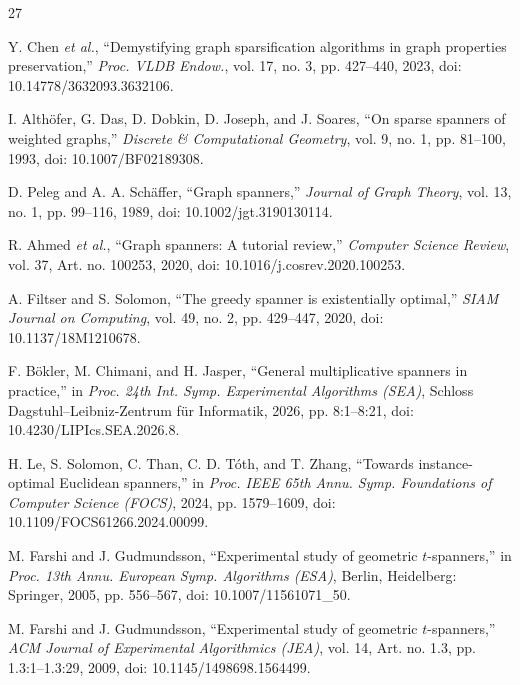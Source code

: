 \documentclass[conference]{IEEEtran}
\begin{document}
\begin{thebibliography}{27}

Y. Chen \textit{et al.},
``Demystifying graph sparsification algorithms in graph properties preservation,''
\textit{Proc. VLDB Endow.},
vol. 17, no. 3, pp. 427--440, 2023,
doi: 10.14778/3632093.3632106.

I. Alth\"{o}fer, G. Das, D. Dobkin, D. Joseph, and J. Soares,
``On sparse spanners of weighted graphs,''
\textit{Discrete \& Computational Geometry},
vol. 9, no. 1, pp. 81--100, 1993,
doi: 10.1007/BF02189308.

D. Peleg and A. A. Sch\"{a}ffer,
``Graph spanners,''
\textit{Journal of Graph Theory},
vol. 13, no. 1, pp. 99--116, 1989,
doi: 10.1002/jgt.3190130114.

R. Ahmed \textit{et al.},
``Graph spanners: A tutorial review,''
\textit{Computer Science Review},
vol. 37, Art. no. 100253, 2020,
doi: 10.1016/j.cosrev.2020.100253.

A. Filtser and S. Solomon,
``The greedy spanner is existentially optimal,''
\textit{SIAM Journal on Computing},
vol. 49, no. 2, pp. 429--447, 2020,
doi: 10.1137/18M1210678.

F. B\"{o}kler, M. Chimani, and H. Jasper,
``General multiplicative spanners in practice,''
in \textit{Proc. 24th Int. Symp. Experimental Algorithms (SEA)},
Schloss Dagstuhl--Leibniz-Zentrum f\"{u}r Informatik, 2026, pp. 8:1--8:21,
doi: 10.4230/LIPIcs.SEA.2026.8.

H. Le, S. Solomon, C. Than, C. D. T\'{o}th, and T. Zhang,
``Towards instance-optimal Euclidean spanners,''
in \textit{Proc. IEEE 65th Annu. Symp. Foundations of Computer Science (FOCS)},
2024, pp. 1579--1609,
doi: 10.1109/FOCS61266.2024.00099.

M. Farshi and J. Gudmundsson,
``Experimental study of geometric $t$-spanners,''
in \textit{Proc. 13th Annu. European Symp. Algorithms (ESA)},
Berlin, Heidelberg: Springer, 2005, pp. 556--567,
doi: 10.1007/11561071\_50.

M. Farshi and J. Gudmundsson,
``Experimental study of geometric $t$-spanners,''
\textit{ACM Journal of Experimental Algorithmics (JEA)},
vol. 14, Art. no. 1.3, pp. 1.3:1--1.3:29, 2009,
doi: 10.1145/1498698.1564499.


\end{thebibliography}
\end{document}
